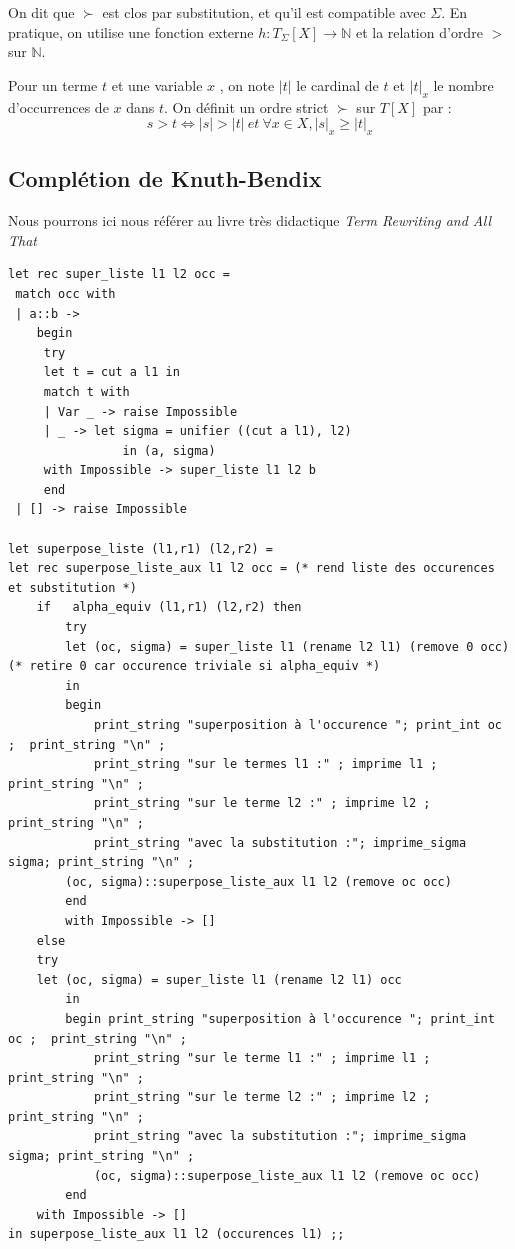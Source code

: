 \documentclass[11pt]{book}
\begin{document}
On dit que $\succ$ est clos par substitution, et qu'il est compatible avec $\Sigma$.
\vspace{0.2cm}
En pratique, on utilise une fonction externe $h : T_\Sigma [X] \rightarrow \mathbb{N} $ et la relation d'ordre $>$ sur 
$\mathbb{N}$.

Pour un terme $t$ et une variable $x$ , on note $|t|$ le cardinal de $t$ et $|t|_x$ le nombre
d'occurrences de $x$ dans $t$. On définit un ordre strict $\succ$ sur $T[X]$ par :
$$ s > t \Leftrightarrow  |s| > |t|\ et\  \forall x \in X, |s|_x ≥ |t|_x $$

\subsection{Complétion de Knuth-Bendix}
Nous pourrons ici nous référer au livre très didactique \textit{Term Rewriting and All That}\cite{rewriting}
\begin{Verbatim}
let rec super_liste l1 l2 occ =
 match occ with
 | a::b -> 
	begin
	 try 
	 let t = cut a l1 in
	 match t with 
	 | Var _ -> raise Impossible
	 | _ -> let sigma = unifier ((cut a l1), l2)
 				in (a, sigma)
	 with Impossible -> super_liste l1 l2 b 
	 end
 | [] -> raise Impossible
  
let superpose_liste (l1,r1) (l2,r2) =
let rec superpose_liste_aux l1 l2 occ = (* rend liste des occurences et substitution *)
	if   alpha_equiv (l1,r1) (l2,r2) then 
		try
		let (oc, sigma) = super_liste l1 (rename l2 l1) (remove 0 occ) (* retire 0 car occurence triviale si alpha_equiv *)
		in 
		begin
			print_string "superposition à l'occurence "; print_int oc ;  print_string "\n" ;
			print_string "sur le termes l1 :" ; imprime l1 ; print_string "\n" ;
			print_string "sur le terme l2 :" ; imprime l2 ; print_string "\n" ;
			print_string "avec la substitution :"; imprime_sigma sigma; print_string "\n" ;
		(oc, sigma)::superpose_liste_aux l1 l2 (remove oc occ)
		end
		with Impossible -> []
	else 
	try
	let (oc, sigma) = super_liste l1 (rename l2 l1) occ
		in 
		begin print_string "superposition à l'occurence "; print_int oc ;  print_string "\n" ;
			print_string "sur le terme l1 :" ; imprime l1 ; print_string "\n" ;
			print_string "sur le terme l2 :" ; imprime l2 ; print_string "\n" ;
			print_string "avec la substitution :"; imprime_sigma sigma; print_string "\n" ;
			(oc, sigma)::superpose_liste_aux l1 l2 (remove oc occ)
		end
	with Impossible -> []
in superpose_liste_aux l1 l2 (occurences l1) ;;
\end{Verbatim}
\end{document}
